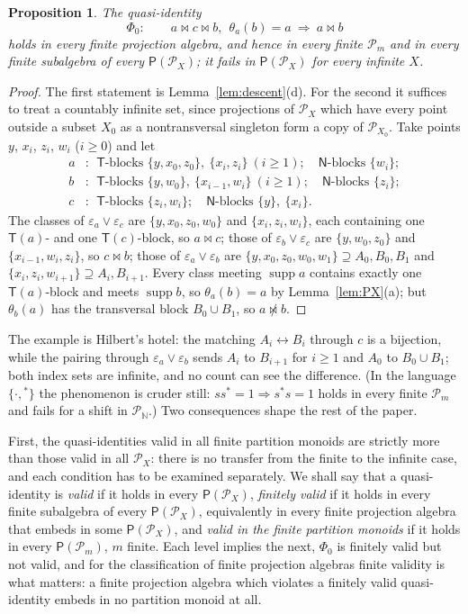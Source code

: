 \documentclass[11pt]{amsart}
\newtheorem{proposition}[theorem]{Proposition}
\theoremstyle{definition}
\renewcommand{\P}{\mathcal{P}}      %
\newcommand{\PA}{\mathsf{P}}         %
\newcommand{\supp}{\operatorname{supp}}
\newcommand{\T}{\mathsf{T}}
\newcommand{\N}{\mathsf{N}}
\newcommand{\mt}{\bowtie}      %
\begin{document}
\begin{proposition}\label{prop:phi0}
The quasi-identity
\[
\Phi_0:\qquad a\mt c\mt b,\ \ \theta_a(b)=a\ \Longrightarrow\ a\mt b
\]
holds in every finite projection algebra, and hence in every finite $\P_m$ and in every finite subalgebra of every $\PA(\P_X)$; it fails in $\PA(\P_X)$ for every infinite $X$.
\end{proposition}

\begin{proof}
The first statement is Lemma~\ref{lem:descent}(d). For the second it suffices to treat a countably infinite set, since projections of $\P_X$ which have every point outside a subset $X_0$ as a nontransversal singleton form a copy of $\P_{X_0}$. Take points $y$, $x_i$, $z_i$, $w_i$ ($i\ge0$) and let
\begin{align*}
a&:\ \ \T\text{-blocks }\{y,x_0,z_0\},\ \{x_i,z_i\}\ (i\ge1);\quad \N\text{-blocks }\{w_i\};\\
b&:\ \ \T\text{-blocks }\{y,w_0\},\ \{x_{i-1},w_i\}\ (i\ge1);\quad \N\text{-blocks }\{z_i\};\\
c&:\ \ \T\text{-blocks }\{z_i,w_i\};\quad \N\text{-blocks }\{y\},\ \{x_i\}.
\end{align*}
The classes of $\varepsilon_a\vee\varepsilon_c$ are $\{y,x_0,z_0,w_0\}$ and $\{x_i,z_i,w_i\}$, each containing one $\T(a)$- and one $\T(c)$-block, so $a\mt c$; those of $\varepsilon_b\vee\varepsilon_c$ are $\{y,w_0,z_0\}$ and $\{x_{i-1},w_i,z_i\}$, so $c\mt b$; those of $\varepsilon_a\vee\varepsilon_b$ are $\{y,x_0,z_0,w_0,w_1\}\supseteq A_0,B_0,B_1$ and $\{x_i,z_i,w_{i+1}\}\supseteq A_i,B_{i+1}$. Every class meeting $\supp a$ contains exactly one $\T(a)$-block and meets $\supp b$, so $\theta_a(b)=a$ by Lemma~\ref{lem:PX}(a); but $\theta_b(a)$ has the transversal block $B_0\cup B_1$, so $a\not\mt b$.
\end{proof}

The example is Hilbert's hotel: the matching $A_i\leftrightarrow B_i$ through $c$ is a bijection, while the pairing through $\varepsilon_a\vee\varepsilon_b$ sends $A_i$ to $B_{i+1}$ for $i\ge1$ and $A_0$ to $B_0\cup B_1$; both index sets are infinite, and no count can see the difference. (In the language $\{\cdot,{}^*\}$ the phenomenon is cruder still: $ss^*=1\Rightarrow s^*s=1$ holds in every finite $\P_m$ and fails for a shift in $\P_{\mathbb N}$.) Two consequences shape the rest of the paper.

First, the quasi-identities valid in all finite partition monoids are strictly more than those valid in all $\P_X$: there is no transfer from the finite to the infinite case, and each condition has to be examined separately. We shall say that a quasi-identity is \emph{valid} if it holds in every $\PA(\P_X)$, \emph{finitely valid} if it holds in every finite subalgebra of every $\PA(\P_X)$, equivalently in every finite projection algebra that embeds in some $\PA(\P_X)$, and \emph{valid in the finite partition monoids} if it holds in every $\PA(\P_m)$, $m$ finite. Each level implies the next, $\Phi_0$ is finitely valid but not valid, and for the classification of finite projection algebras finite validity is what matters: a finite projection algebra which violates a finitely valid quasi-identity embeds in no partition monoid at all.
\end{document}
